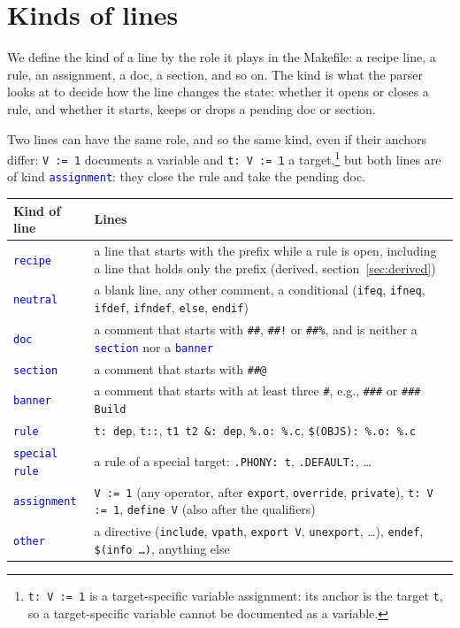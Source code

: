 \documentclass[11pt]{article}
\newcommand{\code}[1]{\mbox{\texttt{#1}}}
\newcommand{\kind}[1]{\textcolor{blue}{\texttt{#1}}}
\begin{document}
\section{Kinds of lines}
\label{sec:kinds}

We define the kind of a line by the role it plays in the Makefile: a recipe line, a rule, an
assignment, a doc, a section, and so on. The kind is what the parser looks at to decide how the line
changes the state: whether it opens or closes a rule, and whether it starts, keeps or drops a
pending doc or section.

Two lines can have the same role, and so the same kind, even if their anchors differ: \code{V := 1}
documents a variable and \code{t: V := 1} a target,\footnote{\code{t: V := 1} is a target-specific
  variable assignment: its anchor is the target \code{t}, so a target-specific variable cannot be
  documented as a variable.} but both lines are of kind \kind{assignment}: they close the rule and
take the pending doc.

\begin{center}
\begin{tabular}{@{}lP{0.7\textwidth}@{}}
  \toprule
  Kind of line & Lines \\
  \midrule
  \kind{recipe} & a line that starts with the prefix while a rule is open, including a line
                  that holds only the prefix (derived, section~\ref{sec:derived}) \\
  \kind{neutral} & a blank line, any other comment, a conditional (\code{ifeq}, \code{ifneq},
                   \code{ifdef}, \code{ifndef}, \code{else}, \code{endif}) \\
  \kind{doc} & a comment that starts with \code{\#\#}, \code{\#\#!} or \code{\#\#\%},
               and is neither a \kind{section} nor a \kind{banner} \\
  \kind{section} & a comment that starts with \code{\#\#@} \\
  \kind{banner} & a comment that starts with at least three \code{\#}, e.g., \code{\#\#\#} or
                  \code{\#\#\# Build} \\
  \kind{rule} & \code{t: dep}, \code{t::}, \code{t1 t2 \&: dep}, \code{\%.o: \%.c},
                \code{\$(OBJS): \%.o: \%.c} \\
  \kind{special rule} & a rule of a special target: \code{.PHONY: t}, \code{.DEFAULT:},
                        \ldots \\
  \kind{assignment} & \code{V := 1} (any operator, after \code{export}, \code{override},
                      \code{private}), \code{t: V := 1}, \code{define V} (also after
                      the qualifiers) \\
  \kind{other} & a directive (\code{include}, \code{vpath}, \code{export V},
                 \code{unexport}, \ldots), \code{endef}, \code{\$(info \ldots)}, anything
                 else \\
  \bottomrule
\end{tabular}
\end{center}
\end{document}
